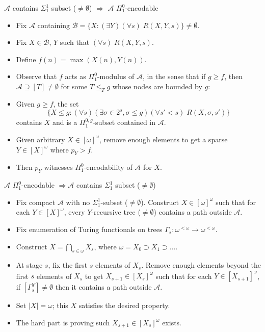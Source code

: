 \begin{frame}{$\mathcal{A}$ contains $\Sigma_1^1$ subset ($\neq\emptyset$)
$\Rightarrow$ $\mathcal{A}$ $\Pi_1^0$-encodable}
  \begin{itemize}
    \item Fix $\mathcal{A}$ containing $\mathcal{B} =\{X: (\exists
      Y)(\forall s)\; R(X,Y,s)\} \neq\emptyset$.
    \item Fix $X\in\mathcal{B}$, $Y$ such that $(\forall s)\;R(X,Y,s)$.
    \item Define $f(n)=\max(X(n),Y(n))$.
    \item Observe that $f$ acts as $\Pi_1^0$-modulus of $\mathcal{A}$, in
      the sense that if $g\geq f$, then $\mathcal{A}\supseteq[T]
      \neq\emptyset$ for some $T\leq_T g$ whose nodes are bounded by $g$:
    \item Given $g\geq f$, the set
      \[\{X\leq g:(\forall s)(\exists \sigma\in 2^s, \sigma\leq g)(\forall
      s'<s)\; R(X,\sigma,s')\}\]
      contains $X$ and is a $\Pi_1^{0,g}$-subset contained in
      $\mathcal{A}$.
    \item Given arbitrary $X\in[\omega]^\omega$, remove enough elements to
      get a sparse $Y\in[X]^\omega$ where $p_Y>f$.
    \item Then $p_Y$ witnesses $\Pi_1^0$-encodability of $\mathcal{A}$ for
      $X$.
  \end{itemize}
\end{frame}

\begin{frame}{$\mathcal{A}$ $\Pi_1^0$-encodable $\Rightarrow \mathcal{A}$
contains $\Sigma_1^1$ subset ($\neq\emptyset$)}
  \begin{itemize}
    \item Fix compact $\mathcal{A}$ with no $\Sigma_1^1$-subset
      ($\neq\emptyset$). Construct $X\in[\omega]^\omega$ such that for each
      $Y\in[X]^\omega$, every $Y$-recursive tree ($\neq\emptyset$) contains
      a path outside $\mathcal{A}$.

    \item Fix enumeration of Turing functionals on trees
      $\Gamma_s:\omega^{<\omega} \rightarrow \omega^{<\omega}$.

    \item Construct $X=\bigcap_{s\in\omega}X_s$, where
      $\omega=X_0\supset X_1\supset\ldots$.

    \item At stage $s$, fix the first $s$ elements of $X_s$. Remove enough
      elements beyond the first $s$ elements of $X_s$ to get
      $X_{s+1}\in[X_s]^\omega$ such that for each $Y\in[X_{s+1}]^\omega$,
      if $[\Gamma_s^Y]\neq\emptyset$ then it contains a path outside
      $\mathcal{A}$.

    \item Set $|X|=\omega$; this $X$ satisfies the desired property.

    \item The hard part is proving such $X_{s+1}\in[X_s]^\omega$ exists.
  \end{itemize}
\end{frame}

